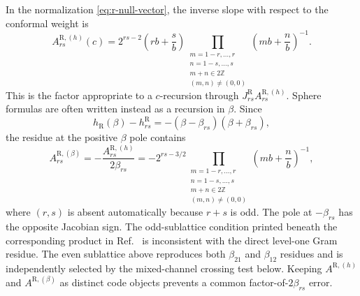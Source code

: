 \documentclass[11pt]{article}
\newcommand{\R}{\mathrm{R}}
\begin{document}
In the normalization \eqref{eq:r-null-vector}, the inverse slope with respect
to the conformal weight is
\begin{equation}
 A^{\R,(h)}_{rs}(c)
 =2^{rs-2}\left(rb+\frac{s}{b}\right)
 \prod_{\substack{m=1-r,\ldots,r\\ n=1-s,\ldots,s\\
                   m+n\in2\mathbb Z\\(m,n)\ne(0,0)}}
 \left(mb+\frac{n}{b}\right)^{-1}.
 \label{eq:r-a-weight}
\end{equation}
This is the factor appropriate to a $c$-recursion through
$J^{\R}_{rs}A^{\R,(h)}_{rs}$.  Sphere formulas are often written instead as
a recursion in $\beta$.  Since
\begin{equation}
 h_{\R}(\beta)-h^{\R}_{rs}
 =-(\beta-\beta_{rs})(\beta+\beta_{rs}),
 \label{eq:r-beta-jacobian}
\end{equation}
the residue at the positive $\beta$ pole contains
\begin{equation}
 A^{\R,(\beta)}_{rs}
 =-\frac{A^{\R,(h)}_{rs}}{2\beta_{rs}}
 =-2^{rs-3/2}
 \prod_{\substack{m=1-r,\ldots,r\\ n=1-s,\ldots,s\\
                   m+n\in2\mathbb Z\\(m,n)\ne(0,0)}}
 \left(mb+\frac{n}{b}\right)^{-1},
 \label{eq:r-a-beta}
\end{equation}
where $(r,s)$ is absent automatically because $r+s$ is odd.  The pole at
$-\beta_{rs}$ has the opposite Jacobian sign.  The odd-sublattice condition
printed beneath the corresponding product in
Ref.~\cite{Suchanek2011EllipticRecursion} is inconsistent with the direct
level-one Gram residue.  The even sublattice above reproduces both
$\beta_{21}$ and $\beta_{12}$ residues and is independently selected by the
mixed-channel crossing test below.  Keeping
$A^{\R,(h)}$ and $A^{\R,(\beta)}$ as distinct code objects prevents a common
factor-of-$2\beta_{rs}$ error.
\end{document}
